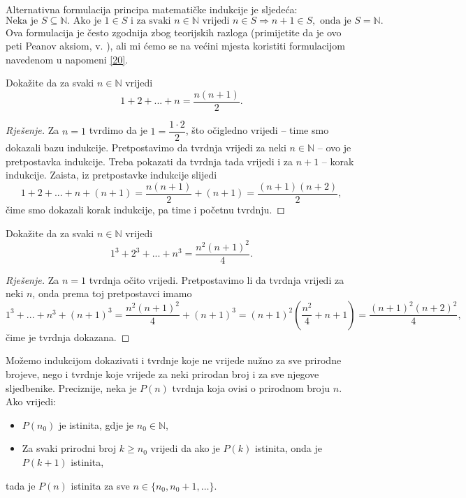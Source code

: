 Alternativna formulacija principa matematičke indukcije je sljedeća:
$$\text{Neka je }S\subseteq \mathbb{N}. \text{ Ako je }1\in S\text{ i za svaki }n\in \mathbb{N}\text{ vrijedi } n\in S\Rightarrow n+1\in S,\text{ onda je }S=\mathbb{N}.$$
Ova formulacija je često zgodnija zbog teorijskih razloga (primijetite da je ovo peti Peanov aksiom, v. \cite{3}), ali mi ćemo se na većini mjesta koristiti formulacijom navedenom u napomeni \ref{20}.
\begin{exercise}
Dokažite da za svaki $n\in \mathbb{N}$ vrijedi
$$1+2+...+n=\dfrac{n(n+1)}{2}.$$
\end{exercise}
\begin{proof}[Rješenje]
Za $n=1$ tvrdimo da je $1=\dfrac{1\cdot 2}{2}$, što očigledno vrijedi -- time smo dokazali bazu indukcije. Pretpostavimo da tvrdnja vrijedi za neki $n\in \mathbb{N}$ -- ovo je pretpostavka indukcije. Treba pokazati da tvrdnja tada vrijedi i za $n+1$ -- korak indukcije. Zaista, iz pretpostavke indukcije slijedi
$$1+2+...+n+(n+1)=\dfrac{n(n+1)}{2}+(n+1)=\dfrac{(n+1)(n+2)}{2},$$
čime smo dokazali korak indukcije, pa time i početnu tvrdnju.
\end{proof}
\begin{exercise}
Dokažite da za svaki $n\in \mathbb{N}$ vrijedi
$$1^3+2^3+...+n^3=\dfrac{n^2(n+1)^2}{4}.$$
\end{exercise}
\begin{proof}[Rješenje]
Za $n=1$ tvrdnja očito vrijedi. Pretpostavimo li da tvrdnja vrijedi za neki $n$, onda prema toj pretpostavci imamo
$$1^3+...+n^3+(n+1)^3=\dfrac{n^2(n+1)^2}{4}+(n+1)^3=(n+1)^2\left(\dfrac{n^2}{4}+n+1\right)=\dfrac{(n+1)^2(n+2)^2}{4},$$
čime je tvrdnja dokazana.
\end{proof}
\begin{remark}
\label{21}
Možemo indukcijom dokazivati i tvrdnje koje ne vrijede nužno za sve prirodne brojeve, nego i tvrdnje koje vrijede za neki prirodan broj i za sve njegove sljedbenike. Preciznije, neka je $P(n)$ tvrdnja koja ovisi o prirodnom broju $n$. Ako vrijedi:
\begin{itemize}
\item $P(n_0)$ je istinita, gdje je $n_0\in \mathbb{N}$,
\item Za svaki prirodni broj $k\geq n_0$ vrijedi da ako je $P(k)$ istinita, onda je $P(k+1)$ istinita,
\end{itemize}
tada je $P(n)$ istinita za sve $n\in \{n_0, n_0+1,\dots\}$.
\end{remark}

